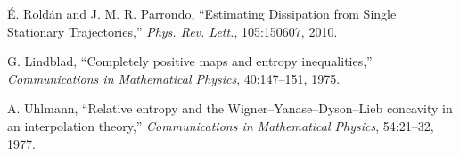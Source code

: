 \documentclass[11pt]{article}
\newcommand{\1}{\mathbbm{1}}
\begin{document}
\begin{thebibliography}{20}
\'E. Rold\'an and J. M. R. Parrondo, ``Estimating Dissipation from Single Stationary Trajectories,'' \emph{Phys. Rev. Lett.}, 105:150607, 2010.

G. Lindblad, ``Completely positive maps and entropy inequalities,'' \emph{Communications in Mathematical Physics}, 40:147--151, 1975.

A. Uhlmann, ``Relative entropy and the Wigner--Yanase--Dyson--Lieb concavity in an interpolation theory,'' \emph{Communications in Mathematical Physics}, 54:21--32, 1977.

\end{thebibliography}
\end{document}
